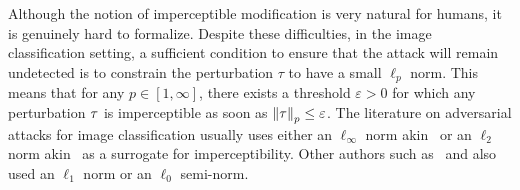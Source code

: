 Although the notion of imperceptible modification is very natural for humans, it is genuinely hard to formalize. Despite these difficulties, in the image classification setting, a sufficient condition to ensure that the attack will remain undetected is to constrain the perturbation ${\tau}$ to have a small $\ell_p$ norm. This means that for any $p \in [1,\infty]$, there exists a threshold $\varepsilon > 0$ for which any perturbation ${\tau}$ is imperceptible as soon as $\norm{{\tau}}_p \leq \varepsilon$. The literature on adversarial attacks for image classification usually uses either an $\ell_\infty$ norm akin~\cite{madry2017towards} or an $\ell_2$ norm akin~\cite{carlini2017adversarial} as a surrogate for imperceptibility. Other authors such as~\cite{chen2018ead} and  \cite{papernot2016distillation} also used an $\ell_1$ norm or an $\ell_0$ semi-norm.

